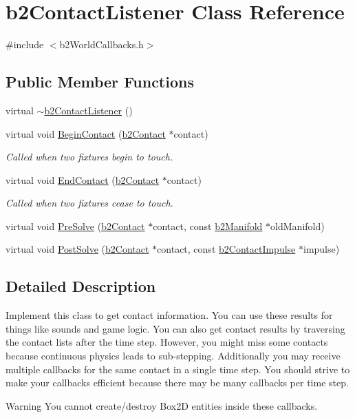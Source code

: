 \hypertarget{classb2_contact_listener}{}\section{b2\+Contact\+Listener Class Reference}
\label{classb2_contact_listener}


{\ttfamily \#include $<$b2\+World\+Callbacks.\+h$>$}

\subsection*{Public Member Functions}
\begin{DoxyCompactItemize}
\item 
virtual \mbox{\hyperlink{classb2_contact_listener_ac823a8fc3da242814ee649c093c74e21}{$\sim$b2\+Contact\+Listener}} ()
\item 
virtual void \mbox{\hyperlink{classb2_contact_listener_a35148fc56fb9eac12077200fbd928f65}{Begin\+Contact}} (\mbox{\hyperlink{classb2_contact}{b2\+Contact}} $\ast$contact)
\begin{DoxyCompactList}\small\item\em Called when two fixtures begin to touch. \end{DoxyCompactList}\item 
virtual void \mbox{\hyperlink{classb2_contact_listener_afb3059058e5c47903a3947c2eef5826b}{End\+Contact}} (\mbox{\hyperlink{classb2_contact}{b2\+Contact}} $\ast$contact)
\begin{DoxyCompactList}\small\item\em Called when two fixtures cease to touch. \end{DoxyCompactList}\item 
virtual void \mbox{\hyperlink{classb2_contact_listener_a416f85eb45a1099053402b15a19a7de0}{Pre\+Solve}} (\mbox{\hyperlink{classb2_contact}{b2\+Contact}} $\ast$contact, const \mbox{\hyperlink{structb2_manifold}{b2\+Manifold}} $\ast$old\+Manifold)
\item 
virtual void \mbox{\hyperlink{classb2_contact_listener_acd58ec96f7569b95eec65b8ca3f8013d}{Post\+Solve}} (\mbox{\hyperlink{classb2_contact}{b2\+Contact}} $\ast$contact, const \mbox{\hyperlink{structb2_contact_impulse}{b2\+Contact\+Impulse}} $\ast$impulse)
\end{DoxyCompactItemize}


\subsection{Detailed Description}
Implement this class to get contact information. You can use these results for things like sounds and game logic. You can also get contact results by traversing the contact lists after the time step. However, you might miss some contacts because continuous physics leads to sub-\/stepping. Additionally you may receive multiple callbacks for the same contact in a single time step. You should strive to make your callbacks efficient because there may be many callbacks per time step. \begin{DoxyWarning}{Warning}
You cannot create/destroy Box2D entities inside these callbacks. 
\end{DoxyWarning}


